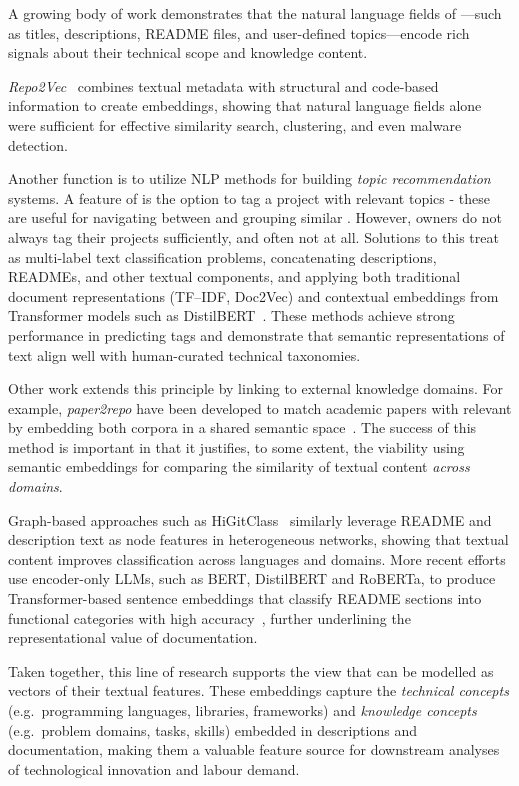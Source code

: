 A growing body of work demonstrates that the natural language fields of \ghrepo{}---such as titles, descriptions, README files, and user-defined topics---encode rich signals about their technical scope and knowledge content.

\emph{Repo2Vec}~\cite{rokon_2021_Repo2VecComprehensive} combines textual metadata with structural and code-based information to create \repo{} embeddings, showing that natural language fields alone were sufficient for effective similarity search, clustering, and even malware detection.

Another function is to utilize NLP methods for building \emph{topic recommendation} systems.
A feature of \ghrepo{} is the option to tag a project with relevant topics - these are useful for navigating between and grouping similar \repos{}. However, \repo{} owners do not always tag their projects sufficiently, and often not at all.
Solutions to this treat \repos{} as multi-label text classification problems, concatenating descriptions, READMEs, and other textual components, and applying both traditional document representations (TF--IDF, Doc2Vec) and contextual embeddings from Transformer models such as DistilBERT~\cite{izadi_2021_TopicRecommendation}.
These methods achieve strong performance in predicting \repo{} tags and demonstrate that semantic representations of \repo{} text align well with human-curated technical taxonomies.

Other work extends this principle by linking \repos{} to external knowledge domains.
For example, \emph{paper2repo} have been developed to match academic papers with relevant \repos{} by embedding both corpora in a shared semantic space~\cite{shao_2020_Paper2repoGitHub}.
The success of this method is important in that it justifies, to some extent, the viability using semantic embeddings for comparing the similarity of textual content \emph{across domains}.

Graph-based approaches such as HiGitClass~\cite{jiang_2019_higitclass} similarly leverage README and description text as node features in heterogeneous networks, showing that textual content improves \repo{} classification across languages and domains.
More recent efforts use encoder-only LLMs, such as BERT, DistilBERT and RoBERTa, to produce Transformer-based sentence embeddings that classify README sections into functional categories with high accuracy~\cite{mehmood_2025_LLMbasedContent}, further underlining the representational value of \repo{} documentation.

Taken together, this line of research supports the view that \ghrepo{} can be modelled as vectors of their textual features.
These embeddings capture the \emph{technical concepts} (e.g.\ programming languages, libraries, frameworks) and \emph{knowledge concepts} (e.g.\ problem domains, tasks, skills) embedded in \repo{} descriptions and documentation, making them a valuable feature source for downstream analyses of technological innovation and labour demand.

